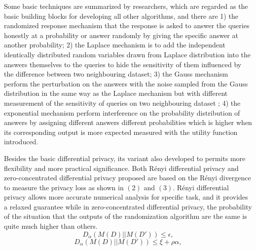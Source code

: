 \documentclass[conference]{IEEEtran}
\begin{document}
Some basic techniques are summarized by researchers, which are regarded as the basic building blocks for developing all other algorithms, and there are 1) the randomized response mechanism that the response is asked to answer the queries honestly at a probability or answer randomly by giving the specific answer at another probability; 2) the Laplace mechanism is to add the independent identically distributed random variables drawn from Laplace distribution into the answers themselves to the queries to hide the sensitivity of them influenced by the difference between two neighbouring dataset; 3) the Gauss mechanism perform the perturbation on the answers with the noise sampled from the Gauss distribution in the same way as the Laplace mechanism but with different measurement of the sensitivity of queries on two neighbouring dataset ; 4) the exponential mechanism perform interference on the probability distribution of answers by assigning different answers different probabilities which is higher when its corresponding output is more expected measured with the utility function introduced.

Besides the basic differential privacy, its variant also developed to permits more flexibility and more practical significance. Both Rényi differential privacy\cite{b4} and zero-concentrated differential privacy\cite{b5} proposed are based on the Rényi divergence to measure the privacy loss as shown in $(2)$ and $(3)$. Rényi differential privacy allows more accurate numerical analysis for specific task, and it provides a relaxed guarantee while in zero-concentrated differential privacy, the probability of the situation that the outputs of the randomization algorithm are the same is quite much higher than others.
\begin{equation}
    D_{\alpha}(M(D)||M(D')) \leq \epsilon,
\end{equation}
\begin{equation}
    D_{\alpha}(M(D)||M(D')) \leq \xi + \rho \alpha,
\end{equation}
\end{document}
